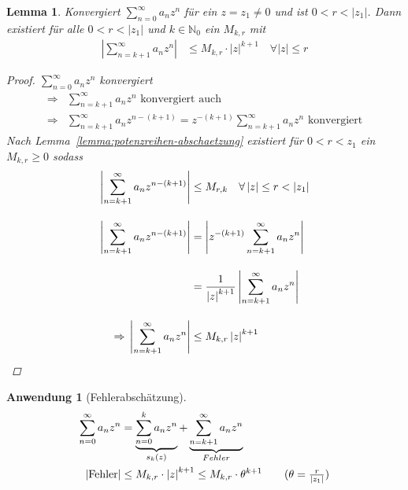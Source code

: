 \documentclass[11pt, twoside, a4paper]{article}
\theoremstyle{plain}
\newtheorem{lemma}[blockelement]{Lemma}
\newtheorem{anwendung}[blockelement]{Anwendung}
\newcommand{\abs}[1]{\left\lvert#1\right\rvert}
\newcommand{\impl}[0]{\Rightarrow{}}
\newcommand{\N}{\mathbb{N}}
\begin{document}
    \begin{lemma} %
        \label{lemma:temp-4}
        Konvergiert $\sum_{n=0}^{\infty} a_n z^n$ für ein $z=z_1 \neq 0$ und ist $0 < r < \abs{z_1}$. Dann existiert für alle $0< r < \abs{z_1}$ und $k\in\N_0$ ein $M_{k,r}$ mit
        \begin{align*}
            \abs{\sum_{n=k+1}^{\infty} a_n z^n} &\leq M_{k,r}\cdot\abs{z}^{k+1}\quad\forall \abs{z} \leq r
        \end{align*}

        \begin{proof}
            $\sum_{n=0}^{\infty} a_n z^n$ konvergiert
            \begin{align*}
                \impl &\sum_{n=k+1}^{\infty} a_n z^n \text{ konvergiert auch }\\
                \impl &\sum_{n=k+1}^{\infty} a_n z^{n-(k+1)} = z^{-(k+1)} \sum_{n=k+1}^{\infty} a_n z^n \text{ konvergiert}
            \end{align*}
            Nach Lemma~\ref{lemma:potenzreihen-abschaetzung} existiert für $0<r<z_1$ ein $M_{k,r} \geq 0$ sodass
            \begin{align*}
                \abs{\sum_{n=k+1}^{\infty} a_n z^{n-(k+1)}} &\leq M_{r,k}\quad\forall \abs{z} \leq r < \abs{z_1}\\[10pt]
                \abs{\sum_{n=k+1}^{\infty} a_n z^{n-(k+1)}} &= \abs{z^{-(k+1)} \sum_{n=k+1}^{\infty} a_n z^n}\\[10pt]
                &= \frac{1}{\abs{z}^{k+1}} \abs{\sum_{n=k+1}^{\infty} a_n z^n}\\[10pt]
                \impl \abs{\sum_{n=k+1}^{\infty} a_n z^n} &\leq M_{k,r} \abs{z}^{k+1}\qedhere
            \end{align*}
        \end{proof}
    \end{lemma}

    \begin{anwendung}[Fehlerabschätzung]
        \begin{align*}
            \sum_{n=0}^{\infty} a_n z^n &= \underbrace{\sum_{n=0}^{k} a_n z^n}_{s_k (z)} + \underbrace{\sum_{n=k+1}^{\infty} a_n z^n}_{Fehler}\\
            \abs{\text{Fehler}} &\leq M_{k,r}\cdot \abs{z}^{k+1} \leq M_{k,r}\cdot \theta^{k+1} \tag{$\theta = \frac{r}{\abs{z_1}}$}
        \end{align*}
    \end{anwendung}
\end{document}
